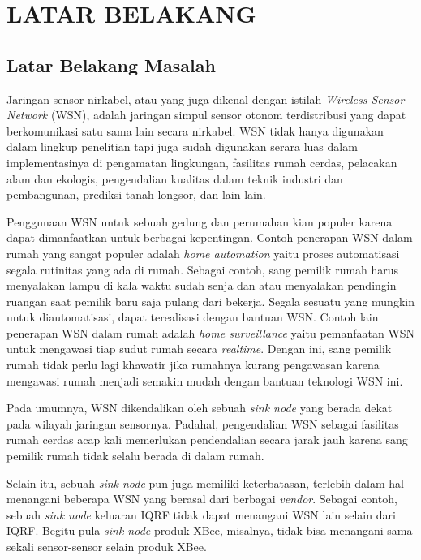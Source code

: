 
\chapter{LATAR BELAKANG}

\section{Latar Belakang Masalah}
Jaringan sensor nirkabel, atau yang juga dikenal dengan istilah \emph{Wireless Sensor Network} (WSN), adalah jaringan simpul sensor otonom terdistribusi yang dapat berkomunikasi satu sama lain secara nirkabel. WSN tidak hanya digunakan dalam lingkup penelitian tapi juga sudah digunakan serara luas dalam implementasinya di pengamatan lingkungan, fasilitas rumah cerdas, pelacakan alam dan ekologis, pengendalian kualitas dalam teknik industri dan pembangunan, prediksi tanah longsor, dan lain-lain.

Penggunaan WSN untuk sebuah gedung dan perumahan kian populer karena dapat dimanfaatkan untuk berbagai kepentingan. Contoh penerapan WSN dalam rumah yang sangat populer adalah \emph{home automation} yaitu proses automatisasi segala rutinitas yang ada di rumah. Sebagai contoh, sang pemilik rumah harus menyalakan lampu di kala waktu sudah senja dan atau menyalakan pendingin ruangan saat pemilik baru saja pulang dari bekerja. Segala sesuatu yang mungkin untuk diautomatisasi, dapat terealisasi dengan bantuan WSN. Contoh lain penerapan WSN dalam rumah adalah \emph{home surveillance} yaitu pemanfaatan WSN untuk mengawasi tiap sudut rumah secara \emph{realtime}. Dengan ini, sang pemilik rumah tidak perlu lagi khawatir jika rumahnya kurang pengawasan karena mengawasi rumah menjadi semakin mudah dengan bantuan teknologi WSN ini.

Pada umumnya, WSN dikendalikan oleh sebuah \emph{sink node} yang berada dekat pada wilayah jaringan sensornya. Padahal, pengendalian WSN sebagai fasilitas rumah cerdas acap kali memerlukan pendendalian secara jarak jauh karena sang pemilik rumah tidak selalu berada di dalam rumah.

Selain itu, sebuah \emph{sink node}-pun juga memiliki keterbatasan, terlebih dalam hal menangani beberapa WSN yang berasal dari berbagai \emph{vendor}. Sebagai contoh, sebuah \emph{sink node} keluaran IQRF tidak dapat menangani WSN lain selain dari IQRF. Begitu pula \emph{sink node} produk XBee, misalnya, tidak bisa menangani sama sekali sensor-sensor selain produk XBee.


